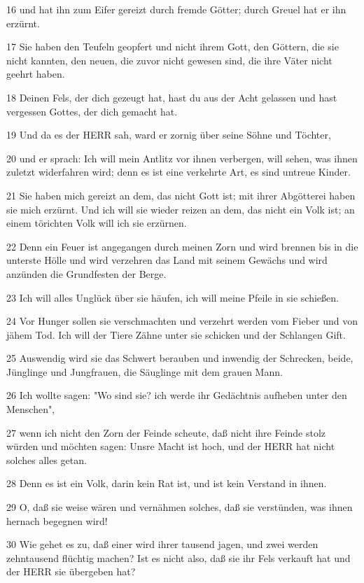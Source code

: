 \par 16 und hat ihn zum Eifer gereizt durch fremde Götter; durch Greuel hat er ihn erzürnt.
\par 17 Sie haben den Teufeln geopfert und nicht ihrem Gott, den Göttern, die sie nicht kannten, den neuen, die zuvor nicht gewesen sind, die ihre Väter nicht geehrt haben.
\par 18 Deinen Fels, der dich gezeugt hat, hast du aus der Acht gelassen und hast vergessen Gottes, der dich gemacht hat.
\par 19 Und da es der HERR sah, ward er zornig über seine Söhne und Töchter,
\par 20 und er sprach: Ich will mein Antlitz vor ihnen verbergen, will sehen, was ihnen zuletzt widerfahren wird; denn es ist eine verkehrte Art, es sind untreue Kinder.
\par 21 Sie haben mich gereizt an dem, das nicht Gott ist; mit ihrer Abgötterei haben sie mich erzürnt. Und ich will sie wieder reizen an dem, das nicht ein Volk ist; an einem törichten Volk will ich sie erzürnen.
\par 22 Denn ein Feuer ist angegangen durch meinen Zorn und wird brennen bis in die unterste Hölle und wird verzehren das Land mit seinem Gewächs und wird anzünden die Grundfesten der Berge.
\par 23 Ich will alles Unglück über sie häufen, ich will meine Pfeile in sie schießen.
\par 24 Vor Hunger sollen sie verschmachten und verzehrt werden vom Fieber und von jähem Tod. Ich will der Tiere Zähne unter sie schicken und der Schlangen Gift.
\par 25 Auswendig wird sie das Schwert berauben und inwendig der Schrecken, beide, Jünglinge und Jungfrauen, die Säuglinge mit dem grauen Mann.
\par 26 Ich wollte sagen: "Wo sind sie? ich werde ihr Gedächtnis aufheben unter den Menschen",
\par 27 wenn ich nicht den Zorn der Feinde scheute, daß nicht ihre Feinde stolz würden und möchten sagen: Unsre Macht ist hoch, und der HERR hat nicht solches alles getan.
\par 28 Denn es ist ein Volk, darin kein Rat ist, und ist kein Verstand in ihnen.
\par 29 O, daß sie weise wären und vernähmen solches, daß sie verstünden, was ihnen hernach begegnen wird!
\par 30 Wie gehet es zu, daß einer wird ihrer tausend jagen, und zwei werden zehntausend flüchtig machen? Ist es nicht also, daß sie ihr Fels verkauft hat und der HERR sie übergeben hat?
